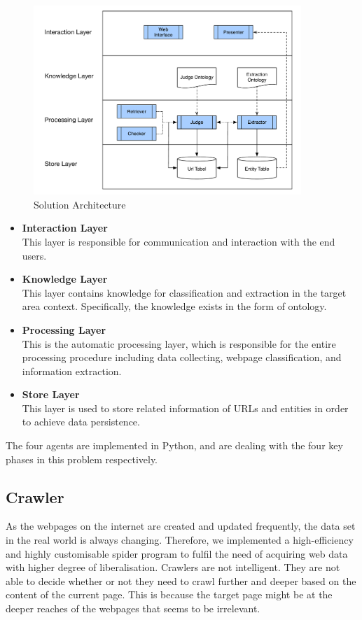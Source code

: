 \begin{figure}[htb]
	\centering
	\includegraphics[page=1,width=0.9\textwidth]{images/diagrams.pdf}
	\caption{Solution Architecture}\label{fig:sys:arch}
\end{figure}

\begin{itemize}
  \item \textbf{Interaction Layer}\\
  This layer is responsible for communication and interaction with the end users.
  \item \textbf{Knowledge Layer}\\
  This layer contains knowledge for classification and extraction in the target area context. Specifically, the knowledge exists in the form of ontology.
  \item \textbf{Processing Layer}\\
  This is the automatic processing layer, which is responsible for the entire processing procedure including data collecting, webpage classification, and information extraction.
  \item \textbf{Store Layer}\\
  This layer is used to store related information of URLs and entities in order to achieve data persistence.
\end{itemize}

\noindent The four agents are implemented in Python, and are dealing with the four key phases in this problem respectively.

\subsection{Crawler}
As the webpages on the internet are created and updated frequently, the data set in the real world is always changing. Therefore, we implemented a high-efficiency and highly customisable spider program to fulfil the need of acquiring web data with higher degree of liberalisation. Crawlers are not intelligent. They are not able to decide whether or not they need to crawl further and deeper based on the content of the current page. This is because the target page might be at the deeper reaches of the webpages that seems to be irrelevant.

